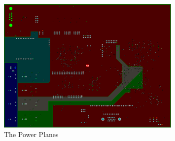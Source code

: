 \begin{figure}[h]
  \centering
  \includegraphics[width=0.8\textwidth]{fig/pcb/power_planes.PNG}
  \caption{The Power Planes}
  \label{fig:power_planes}
\end{figure}
